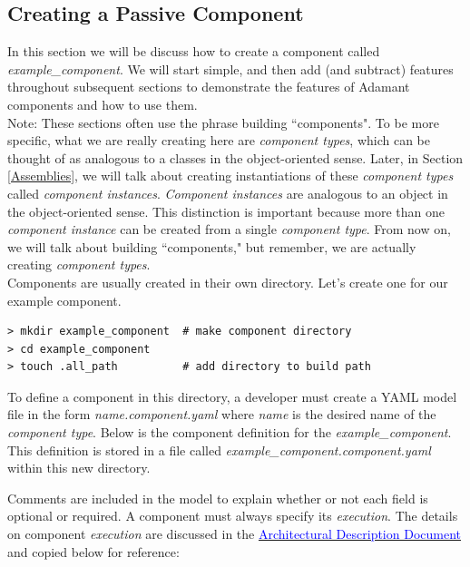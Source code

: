 \subsection{Creating a Passive Component} \label{Creating a Passive Component}

In this section we will be discuss how to create a component called \textit{example\_component}. We will start simple, and then add (and subtract) features throughout subsequent sections to demonstrate the features of Adamant components and how to use them. \\

Note: These sections often use the phrase building ``components". To be more specific, what we are really creating here are \textit{component types}, which can be thought of as analogous to a classes in the object-oriented sense. Later, in Section \ref{Assemblies}, we will talk about creating instantiations of these \textit{component types} called \textit{component instances}. \textit{Component instances} are analogous to an object in the object-oriented sense. This distinction is important because more than one \textit{component instance} can be created from a single \textit{component type}. From now on, we will talk about building ``components," but remember, we are actually creating \textit{component types}. \\

Components are usually created in their own directory. Let's create one for our example component.

\vspace{5mm} %
\begin{verbatim}
> mkdir example_component  # make component directory
> cd example_component 
> touch .all_path          # add directory to build path
\end{verbatim}
\vspace{5mm} %

To define a component in this directory, a developer must create a YAML model file in the form \textit{name.component.yaml} where \textit{name} is the desired name of the \textit{component type}. Below is the component definition for the \textit{example\_component}. This definition is stored in a file called \textit{example\_component.component.yaml} within this new directory.


Comments are included in the model to explain whether or not each field is optional or required. A component must always specify its \textit{execution}. The details on component \textit{execution} are discussed in the \href{https://github.com/lasp/adamant/blob/main/doc/architecture_description_document/architecture_description_document.pdf}{\textcolor{blue}{Architectural Description Document}} and copied below for reference:


